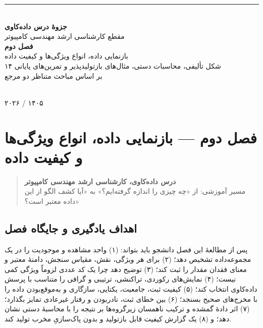 \documentclass[12pt,a4paper,oneside]{book}
\begin{document}
\begin{titlepage}
\centering
\vspace*{2cm}
{\color{AcademicTeal}\rule{0.8\textwidth}{2.5pt}}\\[1.3cm]
{\Huge\bfseries جزوهٔ درس داده‌کاوی}\\[0.6cm]
{\Large مقطع کارشناسی ارشد مهندسی کامپیوتر}\\[2.0cm]
{\Huge\bfseries فصل دوم}\\[0.5cm]
{\LARGE بازنمایی داده، انواع ویژگی‌ها و کیفیت داده}\\[1.4cm]
{\large ۱۴ شکل تألیفی، محاسبات دستی، مثال‌های بازتولیدپذیر و تمرین‌های پایانی}\\[2.2cm]
{\large بر اساس مباحث متناظر دو مرجع}\par
{\small{}}\\[0.1cm]
{\small{}}
\vfill
{\large ۲۰۲۶ / ۱۴۰۵}
\end{titlepage}
\tableofcontents
\clearpage

\frontmatter

\mainmatter
\chapter*{فصل دوم --- بازنمایی داده، انواع ویژگی‌ها و کیفیت داده}\label{ux641ux635ux644-ux62fux648ux645-ux628ux627ux632ux646ux645ux627ux6ccux6cc-ux62fux627ux62fux647-ux627ux646ux648ux627ux639-ux648ux6ccux698ux6afux6ccux647ux627-ux648-ux6a9ux6ccux641ux6ccux62a-ux62fux627ux62fux647}

\begin{quote}
\textbf{درس داده‌کاوی، کارشناسی ارشد مهندسی کامپیوتر}\\
مسیر آموزشی: از «چه چیزی را اندازه گرفته‌ایم؟» به «آیا کشف الگو از این داده معتبر است؟»
\end{quote}

\section{اهداف یادگیری و جایگاه فصل}\label{ux627ux647ux62fux627ux641-ux6ccux627ux62fux6afux6ccux631ux6cc-ux648-ux62cux627ux6ccux6afux627ux647-ux641ux635ux644}

پس از مطالعهٔ این فصل دانشجو باید بتواند: (۱) واحد مشاهده و موجودیت را در یک مجموعه‌داده تشخیص دهد؛ (۲) برای هر ویژگی، نقش، مقیاس سنجش، دامنهٔ معتبر و معنای فقدان مقدار را ثبت کند؛ (۳) توضیح دهد چرا یک کد عددی لزوماً ویژگی کمی نیست؛ (۴) نمایش‌های رکوردی، تراکنشی، ترتیبی و گرافی را متناسب با پرسش داده‌کاوی انتخاب کند؛ (۵) کیفیت ثبت، جامعیت، یکتایی، سازگاری و به‌موقع‌بودن داده را با مخرج‌های صحیح بسنجد؛ (۶) بین خطای ثبت، نادر‌بودن و رفتار غیرعادی تمایز بگذارد؛ (۷) اثر دادهٔ گمشده و ترکیب ناهمسان زیرگروه‌ها بر نتیجه را با محاسبهٔ دستی نشان دهد؛ و (۸) یک گزارش کیفیت قابل بازتولید و بدون پاک‌سازیِ مخرب تولید کند.
\end{document}

